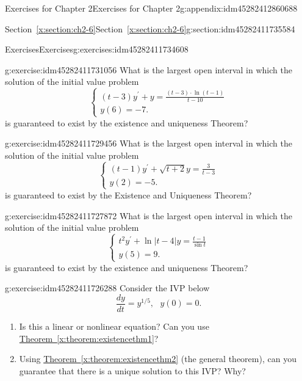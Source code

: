 \documentclass[oneside,10pt,]{book}
\numberwithin{equation}{section}
\numberwithin{equation}{section}
\begin{document}
\begin{appendixptx}{Exercises for Chapter 2}{}{Exercises for Chapter 2}{}{}{g:appendix:idm45282412860688}
\begin{sectionptx}{Section~\ref*{x:section:ch2-6}}{}{Section~\ref*{x:section:ch2-6}}{}{}{g:section:idm45282411735584}
\begin{exercises-subsection-numberless}{Exercises}{}{Exercises}{}{}{g:exercises:idm45282411734608}
\begin{divisionexercise}{2}{}{}{g:exercise:idm45282411731056}
What is the largest open interval in which the solution of the initial value problem%
\begin{equation*}
\begin{cases}
\left(t-3\right)y^{\prime}+y=\frac{\left(t-3\right)\cdot\ln\left(t-1\right)}{t-10}\\
y(6)=-7.
\end{cases}
\end{equation*}
is guaranteed to exist by the existence and uniqueness Theorem?%
\end{divisionexercise}%
\begin{divisionexercise}{3}{}{}{g:exercise:idm45282411729456}%
What is the largest open interval in which the solution of the initial value problem%
\begin{equation*}
\begin{cases}
\left(t-1\right)y^{\prime}+\sqrt{t+2}y=\frac{3}{t-3}\\
y(2)=-5.
\end{cases}
\end{equation*}
is guaranteed to exist by the Existence and Uniqueness Theorem?%
\end{divisionexercise}%
\begin{divisionexercise}{4}{}{}{g:exercise:idm45282411727872}%
What is the largest open interval in which the solution of the initial value problem%
\begin{equation*}
\begin{cases}
t^{2}y^{\prime}+\ln\left|t-4\right|y=\frac{t-1}{\sin t}\\
y(5)=9.
\end{cases}
\end{equation*}
is guaranteed to exist by the existence and uniqueness Theorem?%
\end{divisionexercise}%
\begin{divisionexercise}{5}{}{}{g:exercise:idm45282411726288}%
Consider the IVP below%
\begin{equation*}
\frac{dy}{dt}=y^{1/5},\,\,\,\,y(0)=0.
\end{equation*}
%
%
\begin{enumerate}[label=(\alph*)]
\item{}Is this a linear or nonlinear equation? Can you use \hyperref[x:theorem:existencethm1]{Theorem~\ref{x:theorem:existencethm1}}?%
\item{}Using \hyperref[x:theorem:existencethm2]{Theorem~\ref{x:theorem:existencethm2}} (the general theorem), can you guarantee that there is a unique solution to this IVP? Why?%

\end{enumerate}
\end{divisionexercise}
\end{exercises-subsection-numberless}
\end{sectionptx}
\end{appendixptx}
\end{document}
